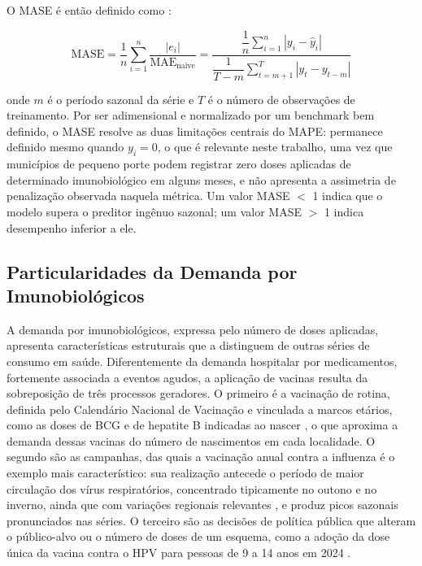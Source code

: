 \documentclass[
    12pt,                %
    openright,           %
    oneside,             %
    a4paper,             %
    english,             %
    brazil               %
]{abntex2}
\begin{document}
O MASE é então definido como \cite{Hyndman2006}:

\begin{equation}
\text{MASE} = \frac{1}{n}\sum_{i=1}^{n}\frac{\left|e_i\right|}{\text{MAE}_{\text{naive}}} = \dfrac{\dfrac{1}{n}\displaystyle\sum_{i=1}^{n}\left|y_i - \hat{y}_i\right|}{\dfrac{1}{T-m}\displaystyle\sum_{t=m+1}^{T}\left|y_t - y_{t-m}\right|}
\end{equation}

onde $m$ é o período sazonal da série e $T$ é o número de observações de treinamento. Por ser adimensional e normalizado por um benchmark bem definido, o MASE resolve as duas limitações centrais do MAPE: permanece definido mesmo quando $y_i = 0$, o que é relevante neste trabalho, uma vez que municípios de pequeno porte podem registrar zero doses aplicadas de determinado imunobiológico em alguns meses, e não apresenta a assimetria de penalização observada naquela métrica. Um valor MASE $<$ 1 indica que o modelo supera o preditor ingênuo sazonal; um valor MASE $>$ 1 indica desempenho inferior a ele.

\subsection{Particularidades da Demanda por Imunobiológicos}
\label{subsec:particularidades}

A demanda por imunobiológicos, expressa pelo número de doses aplicadas, apresenta características estruturais que a distinguem de outras séries de consumo em saúde. Diferentemente da demanda hospitalar por medicamentos, fortemente associada a eventos agudos, a aplicação de vacinas resulta da sobreposição de três processos geradores. O primeiro é a vacinação de rotina, definida pelo Calendário Nacional de Vacinação e vinculada a marcos etários, como as doses de BCG e de hepatite B indicadas ao nascer \cite{BrasilCalendario2026}, o que aproxima a demanda dessas vacinas do número de nascimentos em cada localidade. O segundo são as campanhas, das quais a vacinação anual contra a influenza é o exemplo mais característico: sua realização antecede o período de maior circulação dos vírus respiratórios, concentrado tipicamente no outono e no inverno, ainda que com variações regionais relevantes \cite{SBIm2026}, e produz picos sazonais pronunciados nas séries. O terceiro são as decisões de política pública que alteram o público-alvo ou o número de doses de um esquema, como a adoção da dose única da vacina contra o HPV para pessoas de 9 a 14 anos em 2024 \cite{BrasilNT412024}.
\end{document}
